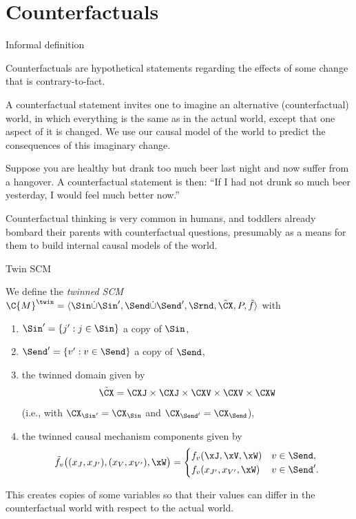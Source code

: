\part{Counterfactuals}
\frame{\partpage}

\begin{frame}{Informal definition}
  \begin{definition}[Informal]
Counterfactuals are hypothetical statements regarding the effects of some change that is contrary-to-fact.
  \end{definition}

  A counterfactual statement invites one to imagine an alternative (counterfactual) world, in which 
  everything is the same as in the actual world, except that one aspect of it is changed.
  We use our causal model of the world to predict the consequences of this imaginary change.

  \begin{example}
  Suppose you are healthy but drank too much beer last night and now suffer from a hangover. 
  A counterfactual statement is then: ``If I had not drunk so much beer yesterday, I would feel much better now.''
  \end{example}

  Counterfactual thinking is very common in humans, and toddlers already bombard
  their parents with counterfactual questions, presumably as a means for them
  to build internal causal models of the world.
\end{frame}

\begin{frame}{Twin SCM}
\begin{definition}
  We define the \emph{twinned SCM} $\C{M}^\twin = \langle \Sin \dot\cup \Sin', \Send \dot\cup \Send', \Srnd, \tilde{\CX}, P, \tilde{f} \rangle$
  with 
  \begin{enumerate}
    \item $\Sin' = \{j' : j \in \Sin\}$ a copy of $\Sin$,
    \item $\Send' = \{v' : v \in \Send\}$ a copy of $\Send$, 
    \item the twinned domain given by
  $$\tilde{\CX} = \CXJ \times \CXJ \times \CXV \times \CXV \times \CXW$$
  (i.e., with $\CX_{\Sin'} = \CX_{\Sin}$ and $\CX_{\Send'} = \CX_{\Send}$),
    \item the twinned causal mechanism components given by
  $$\tilde{f}_v\big((x_J,x_{J'}),(x_V,x_{V'}),\xW\big) = 
  \begin{cases}
    f_v(\xJ,\xV,\xW) & v \in \Send,  \\
    f_v(x_{J'},x_{V'},\xW) & v \in \Send'.
  \end{cases}$$
  \end{enumerate}
\end{definition}
  This creates copies of some variables so that their values can differ in the counterfactual world with respect to the actual world.
\end{frame}

